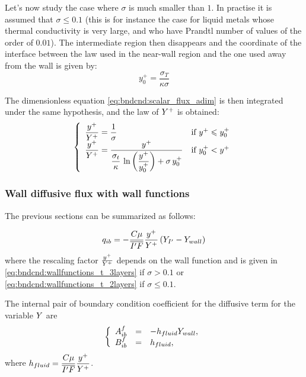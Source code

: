 Let's now study the case where  $\sigma$ is much smaller than $1$.
In practise it is assumed that $\sigma \leqslant 0.1$ (this is for
instance the case for liquid metals whose thermal conductivity is very
large, and who have Prandtl number of values of the order of $0.01$).
The intermediate region then disappears and the coordinate of the
interface between the law used in the near-wall region and the one
used away from the wall is given by:
\begin{equation}
y^+_0= \displaystyle\frac{\sigma_T}{\kappa\sigma}
\end{equation}

The dimensionless equation \eqref{eq:bndcnd:scalar_flux_adim}
is then integrated under the same hypothesis, and the law of
 $Y^+$ is obtained:
\begin{equation}\label{eq:bndcnd:wallfunctions_t_2layers}
\left\{
\begin{array}{ll}
\dfrac{y^+}{Y^+} = \dfrac{1}{\sigma} & \text{if } y^+ \leqslant y^+_0 \\
\dfrac{y^+}{Y^+} = \dfrac{y^+}{\displaystyle\frac{\sigma_t}{\kappa}\,
        \ln\left(\displaystyle\frac{y^+}{y^+_0}\right)+\sigma \,y^+_0}
                   & \text{if } y^+_0 < y^+
\end{array}
\right.
\end{equation}

\subsubsection{Wall diffusive flux with wall functions}
The previous sections can be summarized as follows:

\begin{equation}
q_{ib} = -\dfrac{C \mu}{\overline{{I^\prime} F} } \dfrac{y^+}{Y^+} \left(Y_{I^\prime} - Y_{wall} \right)
\end{equation}
%
where the rescaling factor $\frac{y^+}{Y^+}$ depends on the wall function and is given in \eqref{eq:bndcnd:wallfunctions_t_3layers} if $\sigma >0.1$ or \eqref{eq:bndcnd:wallfunctions_t_2layers} if $\sigma \leq 0.1$.

The internal pair of boundary condition coefficient for the diffusive term for the variable $Y $ are
\begin{equation}
\left\lbrace
\begin{array}{r c l}
A^f_{ib} & = & -h_{fluid} Y_{wall}, \\
B^f_{ib} & = & h_{fluid},
\end{array}
\right.
\end{equation}
where $h_{fluid} = \dfrac{C \mu}{\overline{{I^\prime} F} } \dfrac{y^+}{Y^+} $.

